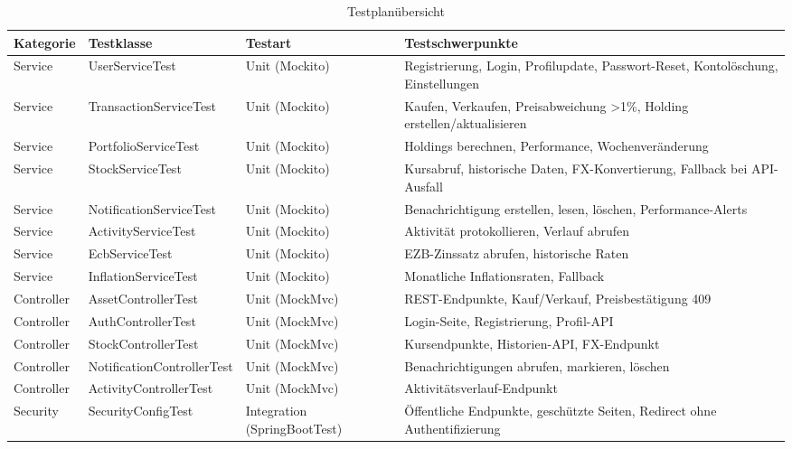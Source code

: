 \documentclass[12pt,a4paper]{article}
\begin{document}


\begin{table}[H]
\centering
\caption{Testplanübersicht}
{\footnotesize
\renewcommand{\arraystretch}{1.0}
\begin{tabularx}{\textwidth}{|l|l|l|X|}
\hline
\textbf{Kategorie} & \textbf{Testklasse} & \textbf{Testart} & \textbf{Testschwerpunkte} \\
\hline
Service & UserServiceTest & Unit (Mockito) & Registrierung, Login, Profilupdate, Passwort-Reset, Kontolöschung, Einstellungen \\
\hline
Service & TransactionServiceTest & Unit (Mockito) & Kaufen, Verkaufen, Preisabweichung >1\%, Holding erstellen/aktualisieren \\
\hline
Service & PortfolioServiceTest & Unit (Mockito) & Holdings berechnen, Performance, Wochenveränderung \\
\hline
Service & StockServiceTest & Unit (Mockito) & Kursabruf, historische Daten, FX-Konvertierung, Fallback bei API-Ausfall \\
\hline
Service & NotificationServiceTest & Unit (Mockito) & Benachrichtigung erstellen, lesen, löschen, Performance-Alerts \\
\hline
Service & ActivityServiceTest & Unit (Mockito) & Aktivität protokollieren, Verlauf abrufen \\
\hline
Service & EcbServiceTest & Unit (Mockito) & EZB-Zinssatz abrufen, historische Raten \\
\hline
Service & InflationServiceTest & Unit (Mockito) & Monatliche Inflationsraten, Fallback \\
\hline
Controller & AssetControllerTest & Unit (MockMvc) & REST-Endpunkte, Kauf/Verkauf, Preisbestätigung 409 \\
\hline
Controller & AuthControllerTest & Unit (MockMvc) & Login-Seite, Registrierung, Profil-API \\
\hline
Controller & StockControllerTest & Unit (MockMvc) & Kursendpunkte, Historien-API, FX-Endpunkt \\
\hline
Controller & NotificationControllerTest & Unit (MockMvc) & Benachrichtigungen abrufen, markieren, löschen \\
\hline
Controller & ActivityControllerTest & Unit (MockMvc) & Aktivitätsverlauf-Endpunkt \\
\hline
Security & SecurityConfigTest & Integration (SpringBootTest) & Öffentliche Endpunkte, geschützte Seiten, Redirect ohne Authentifizierung \\

\end{tabularx}}
\end{table}
\end{document}
